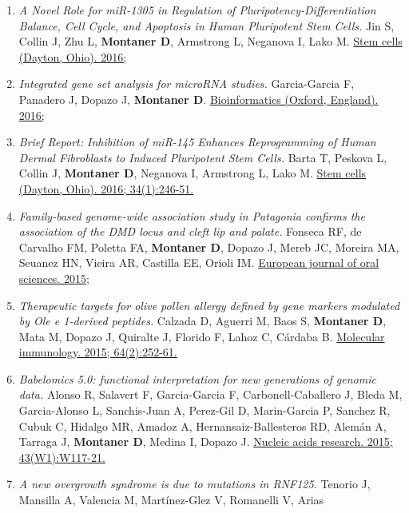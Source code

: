 \begin{enumerate}
\def\labelenumi{\arabic{enumi}.}
\tightlist
\item
  \emph{A Novel Role for miR-1305 in Regulation of
  Pluripotency-Differentiation Balance, Cell Cycle, and Apoptosis in
  Human Pluripotent Stem Cells.} Jin S, Collin J, Zhu L,
  \textbf{Montaner D}, Armstrong L, Neganova I, Lako M.
  \href{http://www.ncbi.nlm.nih.gov//pubmed/27339422}{Stem cells
  (Dayton, Ohio). 2016;}
\item
  \emph{Integrated gene set analysis for microRNA studies.}
  Garcia-Garcia F, Panadero J, Dopazo J, \textbf{Montaner D}.
  \href{http://www.ncbi.nlm.nih.gov//pubmed/27324197}{Bioinformatics
  (Oxford, England). 2016;}
\item
  \emph{Brief Report: Inhibition of miR-145 Enhances Reprogramming of
  Human Dermal Fibroblasts to Induced Pluripotent Stem Cells.} Barta T,
  Peskova L, Collin J, \textbf{Montaner D}, Neganova I, Armstrong L,
  Lako M. \href{http://www.ncbi.nlm.nih.gov//pubmed/26418476}{Stem cells
  (Dayton, Ohio). 2016; 34(1):246-51.}
\item
  \emph{Family-based genome-wide association study in Patagonia confirms
  the association of the DMD locus and cleft lip and palate.} Fonseca
  RF, de Carvalho FM, Poletta FA, \textbf{Montaner D}, Dopazo J, Mereb
  JC, Moreira MA, Seuanez HN, Vieira AR, Castilla EE, Orioli IM.
  \href{http://www.ncbi.nlm.nih.gov//pubmed/26331285}{European journal
  of oral sciences. 2015;}
\item
  \emph{Therapeutic targets for olive pollen allergy defined by gene
  markers modulated by Ole e 1-derived peptides.} Calzada D, Aguerri M,
  Baos S, \textbf{Montaner D}, Mata M, Dopazo J, Quiralte J, Florido F,
  Lahoz C, Cárdaba B.
  \href{http://www.ncbi.nlm.nih.gov//pubmed/25553522}{Molecular
  immunology. 2015; 64(2):252-61.}
\item
  \emph{Babelomics 5.0: functional interpretation for new generations of
  genomic data.} Alonso R, Salavert F, Garcia-Garcia F,
  Carbonell-Caballero J, Bleda M, Garcia-Alonso L, Sanchis-Juan A,
  Perez-Gil D, Marin-Garcia P, Sanchez R, Cubuk C, Hidalgo MR, Amadoz A,
  Hernansaiz-Ballesteros RD, Alemán A, Tarraga J, \textbf{Montaner D},
  Medina I, Dopazo J.
  \href{http://www.ncbi.nlm.nih.gov//pubmed/25897133}{Nucleic acids
  research. 2015; 43(W1):W117-21.}
\item
  \emph{A new overgrowth syndrome is due to mutations in RNF125.}
  Tenorio J, Mansilla A, Valencia M, Martínez-Glez V, Romanelli V, Arias

\end{enumerate}
